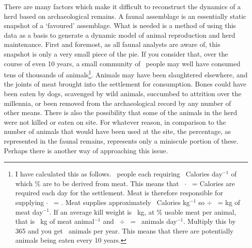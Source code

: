 There are many factors which make it difficult to reconstruct the dynamics of a %
herd based on archaeological remains. A faunal assemblage is an essentially static snapshot of a `favoured' assemblage.  What is needed is a method of using this data as a basis to generate a dynamic model of animal reproduction and herd maintenance.  First and foremost, as all faunal analysts are aware of, this snapshot is only a very small piece of the pie.   If you consider that, over the course of even 10 years, a small community of \population\ people may well have consumed tens of thousands of animals\footnote{\label{pop1000Example}I have calculated this as follows.  \population\ people each requiring \requiredCals\ Calories day$^{-1}$ of which \meatPercentInt \% are to be derived from meat.  This means that \population\ $\cdot$ \requiredCals\ = \numprint{\siteCals} Calories are required each day for the settlement.  Meat is therefore responsible for supplying \numprint{\siteCals} $\cdot$ \meatPercentPct\ = \numprint{\calsForSiteFromMeat}.  Meat supplies approximately \calsInMeat\ Calories kg$^{-1}$ so \numprint{\calsForSiteFromMeat} $\div$ \calsInMeat\ = \numprint{\kgPerDayMeat} kg of meat day$^{-1}$.  If an average kill weight is \avgKillWeight\ kg, at \usableMeatInt \% usable meat per animal, that is \meatPerAnimal\ kg of meat animal$^{-1}$ and \kgPerDayMeat\ $\div$ \meatPerAnimal\ =  \animalsPerDay\ animals day$^{-1}$.  Multiply this by 365 and you get \animalsPerYear\ animals per year.  This means that there are potentially \numprint{\animalsPerDecade} animals being eaten every 10 years.}.  Animals may have been slaughtered elsewhere, and the joints of meat brought into the settlement for consumption.  Bones could have been eaten by dogs, scavenged by wild animals, succumbed to attrition over the millennia, or been removed from the archaeological record by any number of other means.  There is also the possibility that some of the animals in the herd were not killed or eaten on site\citep[p301]{Payne1973}.  For whatever reason, in comparison to the number of animals that would have been used at the site, the percentage, as represented in the faunal remains, represents only a miniscule portion of these. Perhaps there is another way of approaching this issue. %

